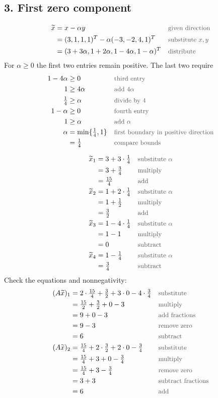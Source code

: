 \documentclass[a4paper,11pt]{article}
\newif\ifexplain
\newcommand{\teil}[1]{\subsection*{#1}}
\newcommand{\why}[1]{\text{\small\color{black!65}#1}}
\newcommand{\explain}[1]{\ifexplain\begin{erklbox}#1\end{erklbox}\fi}
\begin{document}
\teil{3. First zero component}
\begin{align*}
\widetilde x&=x-\alpha y&&\why{given direction}\\
&=(3,1,1,1)^T-\alpha(-3,-2,4,1)^T&&\why{substitute $x,y$}\\
&=(3+3\alpha,1+2\alpha,1-4\alpha,1-\alpha)^T&&\why{distribute}
\end{align*}
For $\alpha\geq0$ the first two entries remain positive. The last two require
\begin{align*}
1-4\alpha&\geq0&&\why{third entry}\\
1&\geq4\alpha&&\why{add $4\alpha$}\\
\tfrac14&\geq\alpha&&\why{divide by 4}\\
1-\alpha&\geq0&&\why{fourth entry}\\
1&\geq\alpha&&\why{add $\alpha$}\\
\alpha&=\min\{\tfrac14,1\}&&\why{first boundary in positive direction}\\
&=\tfrac14&&\why{compare bounds}
\end{align*}
\explain{Nur Komponenten mit positivem Eintrag in $y$ werden bei positivem $\alpha$ kleiner, weil wir $\alpha y$ abziehen. Deshalb begrenzen hier nur die dritte und vierte Komponente den Schritt. Das kleinste Verhältnis trifft zuerst auf null. Ein größerer Schritt würde die dritte Komponente negativ machen.}
\begin{align*}
\widetilde x_1&=3+3\cdot\tfrac14&&\why{substitute $\alpha$}\\
&=3+\tfrac34&&\why{multiply}\\
&=\tfrac{15}{4}&&\why{add}\\
\widetilde x_2&=1+2\cdot\tfrac14&&\why{substitute $\alpha$}\\
&=1+\tfrac12&&\why{multiply}\\
&=\tfrac32&&\why{add}\\
\widetilde x_3&=1-4\cdot\tfrac14&&\why{substitute $\alpha$}\\
&=1-1&&\why{multiply}\\
&=0&&\why{subtract}\\
\widetilde x_4&=1-\tfrac14&&\why{substitute $\alpha$}\\
&=\tfrac34&&\why{subtract}
\end{align*}
Check the equations and nonnegativity:
\begin{align*}
(A\widetilde x)_1&=2\cdot\tfrac{15}{4}+\tfrac32+3\cdot0-4\cdot\tfrac34&&\why{substitute}\\
&=\tfrac{15}{2}+\tfrac32+0-3&&\why{multiply}\\
&=9+0-3&&\why{add fractions}\\
&=9-3&&\why{remove zero}\\
&=6&&\why{subtract}\\
(A\widetilde x)_2&=\tfrac{15}{4}+2\cdot\tfrac32+2\cdot0-\tfrac34&&\why{substitute}\\
&=\tfrac{15}{4}+3+0-\tfrac34&&\why{multiply}\\
&=\tfrac{15}{4}+3-\tfrac34&&\why{remove zero}\\
&=3+3&&\why{subtract fractions}\\
&=6&&\why{add}
\end{align*}
\end{document}
